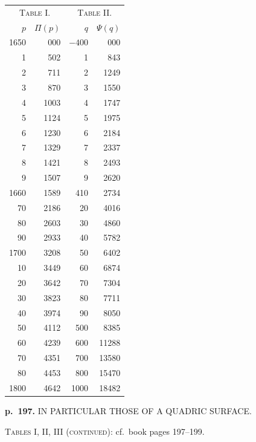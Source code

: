 \documentclass[11pt,a4paper]{book}
\begin{document}
\begin{center}
\begin{tabular}{rr@{\qquad\qquad}rr}
\multicolumn{2}{c}{\textsc{Table I.}} & \multicolumn{2}{c}{\textsc{Table II.}} \\
$p$ & $\Pi(p)$ & $q$ & $\Psi(q)$ \\
\hline
1650 & 000 & $-400$ & 000 \\
1 & 502 & 1 & 843 \\
2 & 711 & 2 & 1249 \\
3 & 870 & 3 & 1550 \\
4 & 1003 & 4 & 1747 \\
5 & 1124 & 5 & 1975 \\
6 & 1230 & 6 & 2184 \\
7 & 1329 & 7 & 2337 \\
8 & 1421 & 8 & 2493 \\
9 & 1507 & 9 & 2620 \\
1660 & 1589 & 410 & 2734 \\
70 & 2186 & 20 & 4016 \\
80 & 2603 & 30 & 4860 \\
90 & 2933 & 40 & 5782 \\
1700 & 3208 & 50 & 6402 \\
10 & 3449 & 60 & 6874 \\
20 & 3642 & 70 & 7304 \\
30 & 3823 & 80 & 7711 \\
40 & 3974 & 90 & 8050 \\
50 & 4112 & 500 & 8385 \\
60 & 4239 & 600 & 11288 \\
70 & 4351 & 700 & 13580 \\
80 & 4453 & 800 & 15470 \\
1800 & 4642 & 1000 & 18482 \\
\end{tabular}
\end{center}

\clearpage

\noindent
\textbf{p.~197.}  IN PARTICULAR THOSE OF A QUADRIC SURFACE.

\begin{center}
\textsc{Tables I, II, III (continued)}: cf.\ book pages 197--199.
\end{center}

\end{document}
